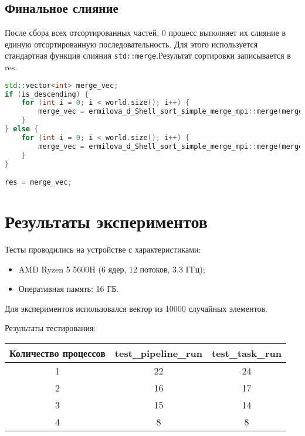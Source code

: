 \documentclass[a4paper,12pt]{article}
\begin{document}
\subsection{Финальное слияние}
После сбора всех отсортированных частей, 0 процесс выполняет их слияние в единую отсортированную последовательность. Для этого используется стандартная функция слияния  \texttt{std::merge}.Результат сортировки записывается в res.
\begin{lstlisting}[language=C++,caption={Финальное слияние}]
std::vector<int> merge_vec;
if (is_descending) {
    for (int i = 0; i < world.size(); i++) {
        merge_vec = ermilova_d_Shell_sort_simple_merge_mpi::merge(merge_vec, sorted_inputs[i], std::greater());
    }
} else {
    for (int i = 0; i < world.size(); i++) {
        merge_vec = ermilova_d_Shell_sort_simple_merge_mpi::merge(merge_vec, sorted_inputs[i], std::less());
    }
}

res = merge_vec;
\end{lstlisting}
\newpage

\section{Результаты экспериментов}
Тесты проводились на устройстве с характеристиками:
\begin{itemize}
    \item AMD Ryzen 5 5600H (6 ядер, 12 потоков, 3.3 ГГц);
    \item Оперативная память: 16 ГБ.
\end{itemize}

Для экспериментов использовался вектор из 10000 случайных элементов.

Результаты тестирования:
\begin{center}
    \begin{tabular}{|c|c|c|}
    \hline
    Количество процессов & test\_pipeline\_run & test\_task\_run \\
    \hline
    1 & 22 & 24 \\
    2 & 16 & 17 \\
    3 & 15 & 14 \\
    4 & 8 & 8 \\
    \hline
    \end{tabular}
\end{center}
\newpage
\end{document}
